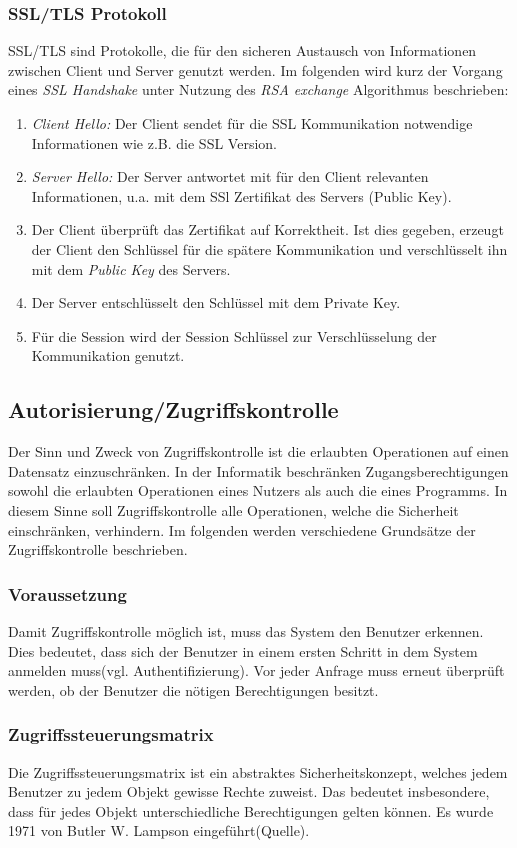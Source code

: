 \subsubsection{SSL/TLS Protokoll}
SSL/TLS sind Protokolle, die für den sicheren Austausch von Informationen zwischen Client und Server genutzt werden. Im folgenden wird kurz der Vorgang eines \textit{SSL Handshake} unter Nutzung des \textit{RSA exchange} Algorithmus beschrieben:
\begin{enumerate}
\item \textit{Client Hello:} Der Client sendet für die SSL Kommunikation notwendige Informationen wie z.B. die SSL Version.
\item \textit{Server Hello:} Der Server antwortet mit für den Client relevanten Informationen, u.a. mit dem SSl Zertifikat des Servers (Public Key).
\item  Der Client überprüft das Zertifikat auf Korrektheit.  Ist dies gegeben, erzeugt der Client den Schlüssel für die spätere Kommunikation und verschlüsselt ihn mit dem \textit{Public Key} des Servers.
\item Der Server entschlüsselt den Schlüssel mit dem Private Key.
\item Für die Session wird der Session Schlüssel zur Verschlüsselung der Kommunikation genutzt.
\end{enumerate}	
\subsection*{Autorisierung/Zugriffskontrolle}

Der Sinn und Zweck von Zugriffskontrolle ist die erlaubten Operationen auf einen Datensatz einzuschränken. In der Informatik beschränken Zugangsberechtigungen sowohl die erlaubten Operationen eines Nutzers als auch die eines Programms. In diesem Sinne soll Zugriffskontrolle alle Operationen, welche die Sicherheit einschränken, verhindern. Im folgenden werden verschiedene Grundsätze der Zugriffskontrolle beschrieben.

\subsubsection{Voraussetzung}
Damit Zugriffskontrolle möglich ist, muss das System den Benutzer erkennen. Dies bedeutet, dass sich der Benutzer in einem ersten Schritt in dem System anmelden muss(vgl. Authentifizierung). Vor jeder Anfrage muss erneut überprüft werden, ob der Benutzer die nötigen Berechtigungen besitzt.
\subsubsection{Zugriffssteuerungsmatrix}
Die Zugriffssteuerungsmatrix ist ein abstraktes Sicherheitskonzept, welches jedem Benutzer zu jedem Objekt gewisse Rechte zuweist. Das bedeutet insbesondere, dass für jedes Objekt unterschiedliche Berechtigungen gelten können. Es wurde 1971 von Butler W. Lampson eingeführt(Quelle).
